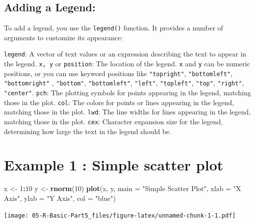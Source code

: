 \documentclass[
]{book}
\newenvironment{Shaded}{\begin{snugshade}}{\end{snugshade}}
\newcommand{\AttributeTok}[1]{\textcolor[rgb]{0.13,0.29,0.53}{#1}}
\newcommand{\DecValTok}[1]{\textcolor[rgb]{0.00,0.00,0.81}{#1}}
\newcommand{\FunctionTok}[1]{\textcolor[rgb]{0.13,0.29,0.53}{\textbf{#1}}}
\newcommand{\NormalTok}[1]{#1}
\newcommand{\OtherTok}[1]{\textcolor[rgb]{0.56,0.35,0.01}{#1}}
\newcommand{\SpecialCharTok}[1]{\textcolor[rgb]{0.81,0.36,0.00}{\textbf{#1}}}
\newcommand{\StringTok}[1]{\textcolor[rgb]{0.31,0.60,0.02}{#1}}
\begin{document}
\subsection*{Adding a Legend:}\label{adding-a-legend}

To add a legend, you use the \texttt{legend()} function. It provides a number of arguments to customize its appearance:

\texttt{legend}: A vector of text values or an expression describing the text to appear in the legend.
\texttt{x,\ y} or \texttt{position}: The location of the legend. \texttt{x} and \texttt{y} can be numeric positions, or you can use keyword positions like \texttt{"topright"}, \texttt{"bottomleft"}, \texttt{"bottomright"} , \texttt{"bottom"}, \texttt{"bottomleft"}, \texttt{"left"}, \texttt{"topleft"}, \texttt{"top"}, \texttt{"right"}, \texttt{"center"}.
\texttt{pch}: The plotting symbols for points appearing in the legend, matching those in the plot.
\texttt{col}: The colors for points or lines appearing in the legend, matching those in the plot.
\texttt{lwd}: The line widths for lines appearing in the legend, matching those in the plot.
\texttt{cex}: Character expansion size for the legend, determining how large the text in the legend should be.

\section*{Example 1 : Simple scatter plot}\label{example-1-simple-scatter-plot}

\begin{Shaded}
\begin{Highlighting}[]

\NormalTok{x }\OtherTok{\textless{}{-}} \DecValTok{1}\SpecialCharTok{:}\DecValTok{10}
\NormalTok{y }\OtherTok{\textless{}{-}} \FunctionTok{rnorm}\NormalTok{(}\DecValTok{10}\NormalTok{)}
\FunctionTok{plot}\NormalTok{(x, y, }\AttributeTok{main =} \StringTok{"Simple Scatter Plot"}\NormalTok{, }\AttributeTok{xlab =} \StringTok{"X Axis"}\NormalTok{, }\AttributeTok{ylab =} \StringTok{"Y Axis"}\NormalTok{, }\AttributeTok{col =} \StringTok{"blue"}\NormalTok{)}
\end{Highlighting}
\end{Shaded}

\texttt{[image: 05-R-Basic-Part5\_files/figure-latex/unnamed-chunk-1-1.pdf]}
\end{document}
